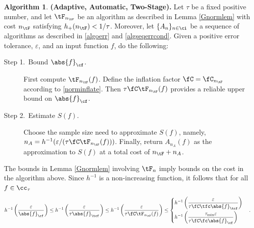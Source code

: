 \documentclass[]{elsarticle}
\theoremstyle{definition}
\newtheorem{algo}{Algorithm}
\theoremstyle{remark}
\newcommand{\Fnorm}[1]{\abs{#1}_{\cf}}
\newcommand{\Ftnorm}[1]{\abs{#1}_{\tcf}}
\begin{document}
\begin{algo} \label{twostagedetalgo} {\bf (Adaptive, Automatic, Two-Stage).} Let $\tau$ be a fixed positive number, and let $\tF_{n_{\tF}}$ be an algorithm as described in Lemma \ref{Gnormlem} with cost $n_{\tF}$ satisfying $h_{+}(n_{\tF}) < 1/\tau$.
Moreover, let  $\{A_n\}_{n \in \ci}$ be a sequence of algorithms as described in \eqref{algoerr} and \eqref{algseqerrcond}.  Given  a positive error tolerance, $\varepsilon$, and  an input function $f$, do the following:

\begin{description} 

\item[Step 1.\ Bound {$\Fnorm{f}$}.] First compute $\tF_{n_{\tF}}(f)$.  Define the inflation factor $\fC=\fC_{n_{\tF}}$ according to \eqref{norminflate}.
Then $\tau \fC \tF_{n_{\tF}}(f)$ provides a reliable upper bound on $\Fnorm{f}$.  

\item [Step 2.\ Estimate {$S(f)$}.] Choose the sample size need to approximate $S(f)$, namely, $n_A=h^{-1}(\varepsilon/(\tau\fC \tF_{n_{\tF}}(f)))$.  Finally, return $A_{n_A}(f)$ as the approximation to $S(f)$ at a total cost of $n_{\tF}+n_A$. 
\end{description}
\end{algo}

The bounds in Lemma \ref{Gnormlem} involving $\tF_n$ imply bounds on the cost in the algorithm above.  Since $h^{-1}$ is a non-increasing function, it follows that for all $f \in \cc_{\tau}$
\begin{equation*}
h^{-1}\left(\frac{\varepsilon}{\Fnorm{f}}\right) \le  h^{-1}\left(\frac{\varepsilon}{\tau\Ftnorm{f}}\right)  \le h^{-1}\left(\frac{\varepsilon}{\tau \fC \tF_{n_{\tF}}(f)}\right) \le 
\begin{cases} \displaystyle  h^{-1}\left(\frac{\varepsilon}{\tau \fC \tfc \Ftnorm{f}}\right) \\[2ex]
\displaystyle  h^{-1}\left(\frac{\tau_{\min} \varepsilon}{\tau \fC \fc \Fnorm{f}}\right)\end{cases}.
\end{equation*}
\end{document}
